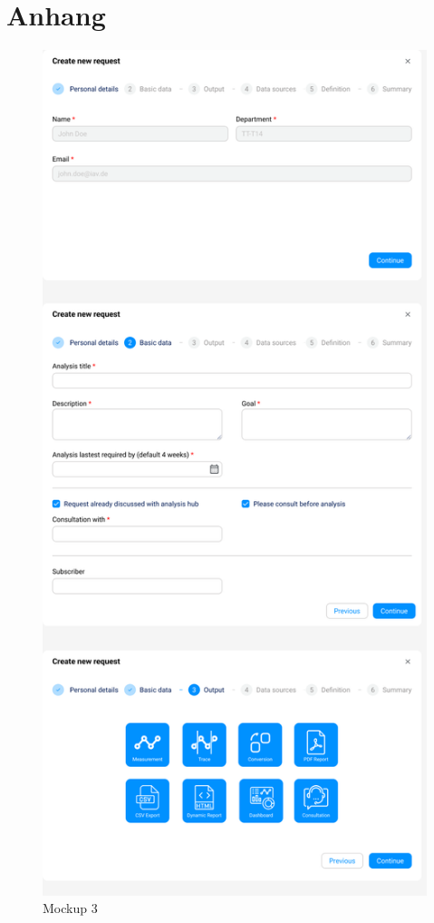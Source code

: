 \chapter{Anhang}
\begin{figure}[H]
    \centering
    \includegraphics[scale=.39]{media/MockUps3.0_1.png}
    \caption{Mockup 3}
    \label{fig: MockUps3.0_1}
\end{figure}
